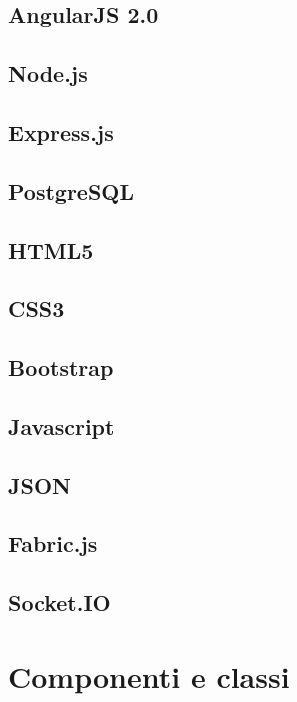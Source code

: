 \documentclass[a4paper, titlepage]{article}
\begin{document}
\subsection{AngularJS 2.0}

\subsection{Node.js}

\subsection{Express.js}

\subsection{PostgreSQL}

\subsection{HTML5}

\subsection{CSS3}

\subsection{Bootstrap}

\subsection{Javascript}

\subsection{JSON}

\subsection{Fabric.js}

\subsection{Socket.IO}

\section{Componenti e classi}

\end{document}
